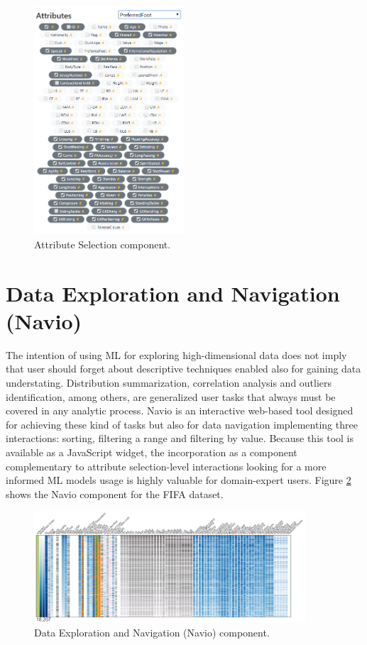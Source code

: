 \begin{figure}[ht]
 \centering
 \includegraphics[width=0.5\textwidth]{attribute-selection.png}
 \caption{Attribute Selection component.}
 \label{fig:attribute-selection-component}
\end{figure}

\section{Data Exploration and Navigation (Navio)}
\label{section4.3}

The intention of using ML for exploring high-dimensional data does not imply that user should forget about descriptive techniques enabled also for gaining data understating. Distribution summarization, correlation analysis and outliers identification, among others, are generalized user tasks that always must be covered in any analytic process. Navio \cite{Guerra-Gomez2018Navio:Datasets} is an interactive web-based tool designed for achieving these kind of tasks but also for data navigation implementing three interactions: sorting, filtering a range and filtering by value. Because this tool is available as a JavaScript widget, the incorporation as a component complementary to attribute selection-level interactions looking for a more informed ML models usage is highly valuable for domain-expert users. Figure \ref{fig:navio-component} shows the Navio component for the FIFA dataset. 

\begin{figure}[ht]
 \centering
 \includegraphics[width=0.9\textwidth]{navio.png}
 \caption{Data Exploration and Navigation (Navio) component.}
 \label{fig:navio-component}
\end{figure}

